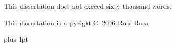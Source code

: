\noindent This dissertation does not exceed sixty thousand words.

\vspace{0.4in}

\noindent This dissertation is copyright \copyright~2006 Russ Ross

\cleardoublepage



\pagestyle{plain}
\enlargethispage*{60cm}        %

{}
\cleardoublepage

%

%        
%


%

{
  \parskip 0pt plus 1pt
  \tableofcontents
}

\cleardoublepage

%

% 

%

% 

%

% 

%

%  

